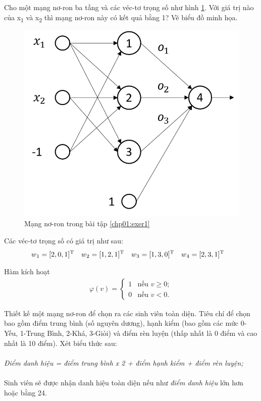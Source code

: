 \begin{exer}
\label{chp01:exer1}
Cho một mạng nơ-ron ba tầng và các véc-tơ trọng số như hình \ref{fig:exercise1}. Với giá trị nào của x\textsubscript{1} và x\textsubscript{2} thì mạng nơ-ron này có kết quả bằng 1? Vẽ biểu đồ minh họa.
\begin{figure}[!h]
	\centering
		\includegraphics[width=0.5\columnwidth]{books/artificial-neural-network/chapter01/figure/excercise-1.png}
    	\caption{Mạng nơ-ron trong bài tập \ref{chp01:exer1}}
	\centering
	\label{fig:exercise1}
\end{figure}

Các véc-tơ trọng số có giá trị như sau:
\begin{align*}
w\textsubscript{1} = [2,0,1] \textsuperscript{T} \quad w\textsubscript{2} = [1,2,1] \textsuperscript{T} \quad w\textsubscript{3} = [1,3,0] \textsuperscript{T} \quad w\textsubscript{4} = [2,3,1] \textsuperscript{T} \quad
\end{align*}

Hàm kích hoạt
\begin{align*}
        \varphi (v) = \left\{ \begin{array}{ll}
        1 & \mbox{nếu $v \geq 0$};\\
        0 & \mbox{nếu $v < 0$}.\end{array} \right.
\end{align*}
\end{exer}

\begin{exer}
\label{chp01:exer2}
Thiết kế một mạng nơ-ron để chọn ra các sinh viên toàn diện. Tiêu chí để chọn bao gồm điểm trung bình (số nguyên dương), hạnh kiểm (bao gồm các mức 0-Yếu, 1-Trung Bình, 2-Khá, 3-Giỏi) và điểm rèn luyện (thấp nhất là 0 điểm và cao nhất là 10 điểm). Xét biểu thức sau:\\
\\
\textit{Điểm danh hiệu =  điểm trung bình x 2 + điểm hạnh kiểm + điểm rèn luyện;}\\
\\
\noindent Sinh viên sẽ được nhận danh hiệu toàn diện nếu như \textit{điểm danh hiệu} lớn hơn hoặc bằng 24.
\end{exer}

